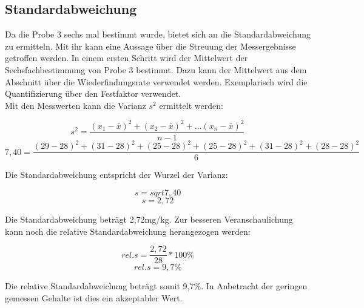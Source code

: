 \subsection{Standardabweichung}
Da die Probe 3 sechs mal bestimmt wurde, bietet sich an die Standardabweichung zu ermitteln. Mit ihr kann eine Aussage über die Streuung der Messergebnisse getroffen werden. In einem ersten Schritt wird der Mittelwert der Sechsfachbestimmung von Probe 3 bestimmt. Dazu kann der Mittelwert aus dem Abschnitt über die Wiederfindungsrate verwendet werden. Exemplarisch wird die Quantifizierung über den Festfaktor verwendet.\\
Mit den Messwerten kann die Varianz $s^{ 2 }$ ermittelt werden:

	\[s^{ 2 }=\frac{ (x_{ 1 }-\bar{x})^{ 2 }+(x_{ 2 }-\bar{x})^{ 2 }+...(x_{ n }-\bar{x})^{ 2 } }{ n-1 }\]
	\[7,40=\frac{ (29-28)^{ 2 }+(31-28)^{ 2 }+(25-28)^{ 2 }+(25-28)^{ 2 }+(31-28)^{ 2 }+(28-28)^{ 2 } }{ 6 }\]

Die Standardabweichung entspricht der Wurzel der Varianz:

	\[s=sqrt{ 7,40 }\]
	\[s=2,72\]

Die Standardabweichung beträgt 2,72mg/kg. Zur besseren Veranschaulichung kann noch die relative Standardabweichung herangezogen werden:

	\[rel.s=\frac{ 2,72 }{ 28 }*100\%\]
	\[rel.s=9,7\%\]
	
Die relative Standardabweichung beträgt somit 9,7\%. In Anbetracht der geringen gemessen Gehalte ist dies ein akzeptabler Wert. 
	
